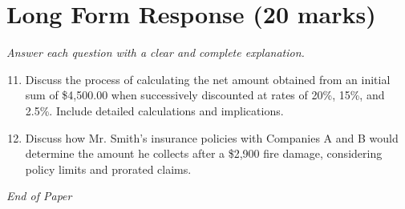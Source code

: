 \documentclass[12pt]{article}
\begin{document}
\section*{Long Form Response (20 marks)}
\textit{Answer each question with a clear and complete explanation.}
\begin{enumerate}[label=\arabic*.]
\setcounter{enumi}{10}
\item Discuss the process of calculating the net amount obtained from an initial sum of \$4,500.00 when successively discounted at rates of 20\%, 15\%, and 2.5\%. Include detailed calculations and implications.
\item Discuss how Mr. Smith's insurance policies with Companies A and B would determine the amount he collects after a \$2,900 fire damage, considering policy limits and prorated claims.
\end{enumerate}

\vfill
\noindent\textit{End of Paper}
\end{document}

